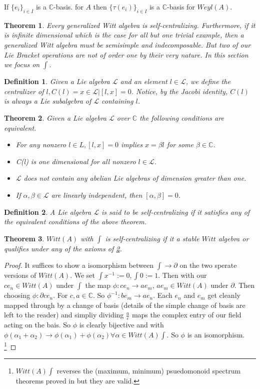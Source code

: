 \documentclass[10pt, oneside]{article}
\newcommand{\C}{\mathbb{C}}
\newtheorem{thm}{Theorem}
\newtheorem{defn}{Definition}
\begin{document}
If $\{ e_i\}_{i \in I}$ is a $\C$-basis.
for $A$ then $\{ \tau(e_i) \}_{i \in I}$
is a $\C$-basis for $Weyl(A)$.
\begin{thm}
Every generalized Witt algebra is self-centralizing. 
Furthermore, if it is infinite dimensional which is the case for all but one trivial example, then a generalized Witt algebra must be semisimple and 
indecomposable. But two of our Lie Bracket operations are not of order one by their very nature. In this section we focus on $\int$.
\end{thm}
\begin{defn}
Given a Lie algebra $\mathcal{L}$ and an element $l \in \mathcal{L}$, we define the
centralizer of $l, C(l) = {x \in \mathcal{L}|[l, x] = 0}$. Notice, by the Jacobi identity, $C(l)$
is always a Lie subalgebra of $\mathcal{L}$ containing $l$.
\end{defn}
\begin{thm} \label{thm:10}
Given a Lie algebra $\mathcal{L}$ over $\C$ the following conditions are equivalent.
\begin{itemize}
\item For any nonzero $l \in L, [l, x] = 0$ implies $x = \beta l$ for some $\beta \in \C$.
\item C(l) is one dimensional for all nonzero $l \in \mathcal{L}$.
\item $\mathcal{L}$ does not contain any abelian Lie algebras of dimension greater than one.
\item If $\alpha, \beta \in \mathcal{L}$ are linearly independent, then $[\alpha, \beta] = 0$.
\end{itemize}
\end{thm}
\begin{defn}
   A Lie algebra $\mathcal{L}$ is said to be self-centralizing if it satisfies any
of the equivalent conditions of the above theorem. 
\end{defn}
\begin{thm}
   $Witt(A)$ with $\int$ is self-centralizing if it a stable $Witt$ algebra or qualifies under any of the axioms of \ref{thm:10}.
\end{thm}
\begin{proof}
   It suffices to show a isomorphism between $\int \to \partial$ on the two sperate versions of $Witt(A)$. We set $\int x^{-1} := 0, \int 0 := 1$. Then with our $c e_n \in Witt(A)$ under $\int$ the map $\phi: c e_n \to a e_m$, $a e_m \in Witt(A)$ under $\partial$. Then choosing $\phi: \partial c e_n$. For $c, a \in \C$. So $\phi^{-1}: b e_m \to a e_{n}$. 
   Each $e_n$ and $e_m$ get cleanly mapped through by a change of basis (details of the simple change of basis are left to the reader) and simpliy dividing $\frac{a}{c}$ maps the complex entry of our field acting on the bais. So $\phi$ is clearly bijective and with $\phi(\alpha_1 + \alpha_2) \to \phi(\alpha_1)+ \phi(\alpha_2) \forall \alpha \in Witt(A) \int$. So $\phi$ is an isomorphism.
   \footnote{$Witt(A) \int$ reverses the (maximum, minimum) psuedomonoid spectrum theorems proved in \cite{pakianathan2010generalizedwittalgebrasvariable} but they are valid.} 
\end{proof}
\end{document}
